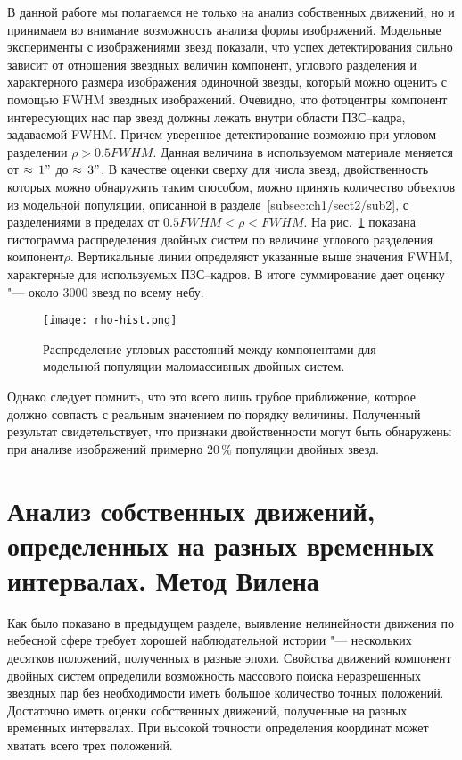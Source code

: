 В данной работе мы полагаемся не только на анализ собственных движений, но и принимаем во внимание возможность анализа формы изображений.  Модельные эксперименты с изображениями звезд показали, что успех детектирования сильно зависит от отношения звездных величин компонент, углового разделения и характерного размера изображения одиночной звезды, который можно оценить с помощью FWHM звездных изображений. Очевидно, что фотоцентры компонент интересующих нас пар звезд должны лежать внутри области ПЗС--кадра, задаваемой FWHM. Причем уверенное детектирование возможно при угловом разделении $\rho>0.5FWHM$.  Данная величина в используемом материале меняется от $\approx\,1"$ до $\approx\,3"$.  В качестве оценки сверху для числа звезд, двойственность которых можно обнаружить таким способом, можно принять количество объектов из модельной популяции, описанной в разделе~\ref{subsec:ch1/sect2/sub2}, с разделениями в пределах от $0.5FWHM<\rho<FWHM$. На рис.~\ref{fig:rho-hist} показана гистограмма распределения двойных систем по величине углового разделения компонент$\rho$. Вертикальные линии определяют указанные выше значения FWHM, характерные для используемых ПЗС--кадров. В итоге суммирование дает оценку "--- около 3000 звезд по всему небу.  

\begin{figure}[pt]\label{fig:rho-hist}
\centering
\texttt{[image: rho-hist.png]}
\caption{ Распределение угловых расстояний между компонентами для модельной популяции маломассивных двойных систем.}
\end{figure}

Однако следует помнить, что это всего лишь грубое приближение, которое должно совпасть с реальным значением по порядку величины. Полученный результат свидетельствует, что признаки двойственности могут быть обнаружены при анализе изображений примерно 20\,\% популяции двойных звезд.

\section{Анализ собственных движений, определенных на разных временных интервалах. Метод Вилена} \label{sec:ch1/sec3}
Как было показано в предыдущем разделе, выявление нелинейности движения по небесной сфере требует хорошей наблюдательной истории "--- нескольких десятков положений, полученных в разные эпохи. Свойства движений компонент двойных систем определили возможность массового поиска неразрешенных звездных пар без необходимости иметь большое количество точных положений. Достаточно иметь оценки собственных движений, полученные на разных временных интервалах. При высокой точности определения координат может хватать всего трех положений.


